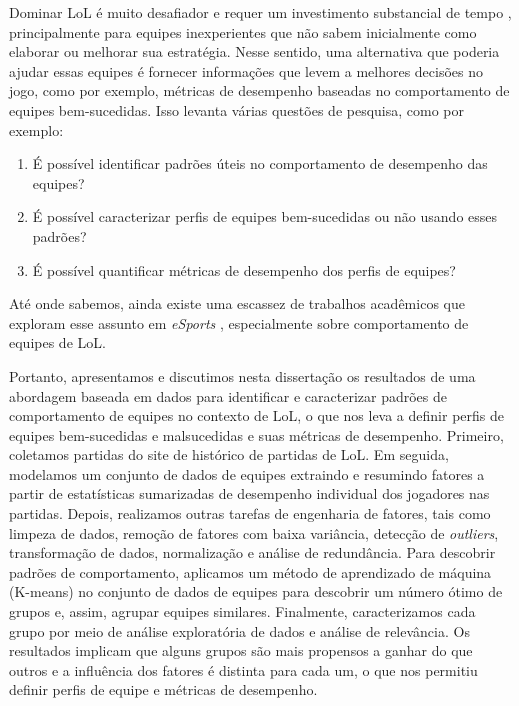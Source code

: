 Dominar LoL é muito desafiador e requer um investimento substancial de tempo \cite{drachen2014skill}, principalmente para equipes inexperientes que não sabem inicialmente como elaborar ou melhorar sua estratégia. Nesse sentido, uma alternativa que poderia ajudar essas equipes é fornecer informações que levem a melhores decisões no jogo, como por exemplo, métricas de desempenho baseadas no comportamento de equipes bem-sucedidas. Isso levanta várias questões de pesquisa, como por exemplo:

\begin{enumerate}[label=(\roman*)]
  \item É possível identificar padrões úteis no comportamento de desempenho das equipes?
  \item É possível caracterizar perfis de equipes bem-sucedidas ou não usando esses padrões?
  \item É possível quantificar métricas de desempenho dos perfis de equipes?
\end{enumerate}

Até onde sabemos, ainda existe uma escassez de trabalhos acadêmicos que exploram esse assunto em \textit{eSports} \cite{drachen2014skill} \cite{ong2015player}, especialmente sobre comportamento de equipes de LoL.

Portanto, apresentamos e discutimos nesta dissertação os resultados de uma abordagem baseada em dados para identificar e caracterizar padrões de comportamento de equipes no contexto de LoL, o que nos leva a definir perfis de equipes bem-sucedidas e malsucedidas e suas métricas de desempenho. Primeiro, coletamos partidas do site de histórico de partidas de LoL. Em seguida, modelamos um conjunto de dados de equipes extraindo e resumindo fatores a partir de estatísticas sumarizadas de desempenho individual dos jogadores nas partidas. Depois, realizamos outras tarefas de engenharia de fatores, tais como limpeza de dados, remoção de fatores com baixa variância, detecção de \textit{outliers}, transformação de dados, normalização e análise de redundância. Para descobrir padrões de comportamento, aplicamos um método de aprendizado de máquina (K-means) no conjunto de dados de equipes para descobrir um número ótimo de grupos e, assim, agrupar equipes similares. Finalmente, caracterizamos cada grupo por meio de análise exploratória de dados e análise de relevância. Os resultados implicam que alguns grupos são mais propensos a ganhar do que outros e a influência dos fatores é distinta para cada um, o que nos permitiu definir perfis de equipe e métricas de desempenho.

